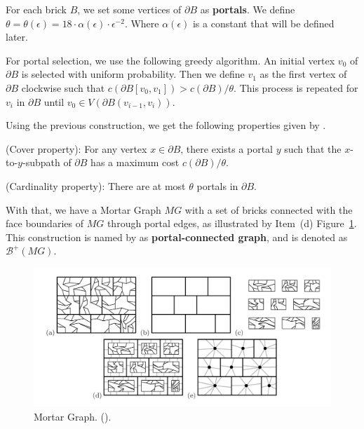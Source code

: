 For each brick \(B\), we set some vertices of \(\partial B\) as \textbf{portals}. We define \(\theta = \theta(\epsilon) = 18 \cdot \alpha(\epsilon) \cdot \epsilon ^ {-2}\). Where \(\alpha(\epsilon)\) is a constant that will be defined later.

For portal selection, we use the following greedy algorithm. An initial vertex \(v_0\) of \(\partial B\) is selected with uniform probability. Then we define \(v_1\) as the first vertex of \(\partial B\) clockwise such that \(c(\partial B[v_0, v_1]) > c(\partial B) / \theta\). This process is repeated for \(v_i\) in \(\partial B\) until \(v_0 \in V(\partial B (v_{i-1}, v_i))\).

Using the previous construction, we get the following properties given by \cite{Borradaile2009b}.

\begin{flemma} \label{lemma:cobertura}
(Cover property): For any vertex \(x \in \partial B\), there exists a portal \(y\) such that the \(x\)-to-\(y\)-subpath of \(\partial B\) has a maximum cost \(c(\partial B) / \theta\).
\end{flemma}

\begin{flemma}
(Cardinality property): There are at most \(\theta\) portals in \(\partial B\).
\end{flemma}

With that, we have a Mortar Graph \(MG\) with a set of bricks connected with the face boundaries of \(MG\) through portal edges, as illustrated by Item~(d) Figure~\ref{fig:mortar3}. This construction is named by \citeauthor{Borradaile2009b} as \textbf{portal-connected graph}, and is denoted as \(\mathcal{B}^{+}(MG)\).

\begin{figure}[H]
    \centering
    \includegraphics[scale=0.4]{imgs/mortar3.png}
    \caption{Mortar Graph. (\cite{Borradaile2009b}).}
    \label{fig:mortar3}
\end{figure}

